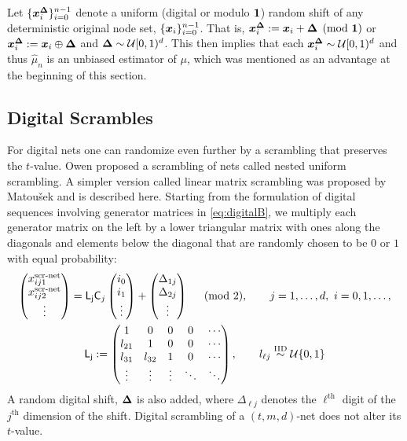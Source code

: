 \documentclass{svproc}
\begin{document}
Let $\{{\boldsymbol{x}}_i^{{\boldsymbol{\Delta}}}\}_{i=0}^{n-1}$ denote a uniform (digital or modulo ${\boldsymbol{1}}$) random shift of any deterministic original node set, $\{{\boldsymbol{x}}_i \}_{i=0}^{n-1}$.  That is, ${\boldsymbol{x}}_i^{{\boldsymbol{\Delta}}} : = {\boldsymbol{x}}_i + {\boldsymbol{\Delta}} \pmod {{\boldsymbol{1}}}$ or  ${\boldsymbol{x}}_i^{{\boldsymbol{\Delta}}} : = {\boldsymbol{x}}_i \oplus {\boldsymbol{\Delta}}$ and ${\boldsymbol{\Delta}} \sim {\mathcal{U}}[0,1)^d$. This then implies that each ${\boldsymbol{x}}_i^{{\boldsymbol{\Delta}}} \sim {\mathcal{U}}[0,1)^d$ and thus $\hat{\mu}_n$ is an unbiased estimator of $\mu$, which was mentioned as an advantage at the beginning of this section.

\subsection{Digital Scrambles} \label{sec:scrambles}
For digital nets one can randomize even further by a scrambling that preserves the $t$-value.  Owen \cite{Owe95} proposed a scrambling of nets called nested uniform scrambling.  A simpler version called linear matrix scrambling was proposed by Matou\v{s}ek \cite{Mat98} and is described here.  Starting from the formulation of digital sequences involving generator matrices in \eqref{eq:digitalB}, we multiply each generator matrix on the left by a lower triangular matrix with ones along the diagonals and elements below the diagonal that are randomly chosen to be $0$ or $1$ with equal probability:
\begin{subequations} \label{eq:scr_lattice}
\begin{gather} \label{eq:digitalscr}
	\begin{pmatrix} x^{\text{scr-net}}_{ij1} \\ x^{\text{scr-net}}_{ij2} \\ \vdots \end{pmatrix}
	= \mathsf{L_j} \mathsf{C}_j \begin{pmatrix} i_0 \\ i_1 \\ \vdots \end{pmatrix} + \begin{pmatrix} \Delta_{1j} \\ \Delta_{2j} \\ \vdots \end{pmatrix} \quad \pmod{2}, \qquad j = 1,\ldots, d, \ i = 0, 1, \ldots, \\
	\mathsf{L_j} :=
	\begin{pmatrix}
		1 & 0 & 0 & 0 & \cdots \\
		l_{21} & 1 & 0 & 0 & \cdots \\
		l_{31} & l_{32} & 1 & 0 & \cdots \\
		\vdots & \vdots & \vdots & \ddots & \ddots
	\end{pmatrix}, \qquad l_{\ell j} \overset {\text{IID}}{\sim} {\mathcal{U}}\{0,1\}
\end{gather}
\end{subequations}
A random digital shift, ${\boldsymbol{\Delta}}$ is also added, where $\Delta_{\ell j}$ denotes the $\ell^{\text{th}}$ digit of the $j^{\text{th}}$ dimension of the shift.  Digital scrambling of a $(t,m,d)$-net does not alter its $t$-value.
\end{document}
